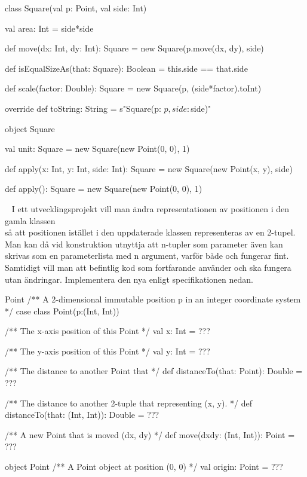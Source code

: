 \TaskSolved \what
 \begin{CodeSmall}
class Square(val p: Point, val side: Int) {
	val area: Int = side*side

	def move(dx: Int, dy: Int): Square = new Square(p.move(dx, dy), side)

	def isEqualSizeAs(that: Square): Boolean = this.side == that.side

	def scale(factor: Double): Square = new Square(p, (side*factor).toInt)

	override def toString: String = s"Square(p: $p, side: $side)"
}

object Square {
	val unit: Square = new Square(new Point(0, 0), 1)

	def apply(x: Int, y: Int, side: Int): Square =
		new Square(new Point(x, y), side)

	def apply(): Square = new Square(new Point(0, 0), 1)
}
\end{CodeSmall}



\QUESTEND









\QUESTBEGIN

\Task \label{task:PointTuple} \what~   I ett utvecklingsprojekt vill man ändra representationen av positionen i den gamla klassen  \\  så att positionen istället i den uppdaterade klassen representeras av en 2-tupel. Man kan då vid konstruktion utnyttja att n-tupler som parameter även kan skrivas som en parameterlista med n argument, varför både  och  fungerar fint. Samtidigt vill man att befintlig kod som fortfarande använder  och  ska fungera utan ändringar.  Implementera den nya  enligt specifikationen nedan.
\begin{ScalaSpec}{Point}
/** A 2-dimensional immutable position p in an integer coordinate system */
case class Point(p:(Int, Int)) {
  /** The x-axis position of this Point */
  val x: Int = ???

  /** The y-axis position of this Point */
  val y: Int = ???

  /** The distance to another Point that */
  def distanceTo(that: Point): Double = ???

  /** The distance to another 2-tuple that representing (x, y). */
  def distanceTo(that: (Int, Int)): Double = ???

  /** A new Point that is moved (dx, dy) */
  def move(dxdy: (Int, Int)): Point = ???
}

object Point {
  /** A Point object at position (0, 0) */
  val origin: Point = ???
}
\end{ScalaSpec}

